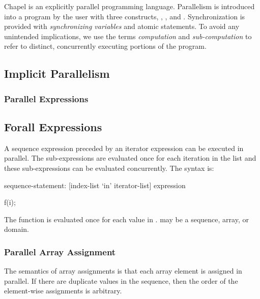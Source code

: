 \label{Parallelism_and_Synchronization}

Chapel is an explicitly parallel programming language. Parallelism is
introduced into a program by the user with three constructs,
, , and .  Synchronization is
provided with \emph{synchronizing variables} and atomic statements. To
avoid any unintended implications, we use the terms \emph{computation}
and \emph{sub-computation} to refer to distinct, concurrently
executing portions of the program.


\subsection{Implicit Parallelism}
\label{Implicit_Parallelism}


\subsubsection{Parallel Expressions}
\label{Parallel_Expressions}

\subsection{Forall Expressions} %
\label{Forall_Expressions}

A sequence expression preceded by an iterator expression can be
executed in parallel. The sub-expressions are evaluated once for each
iteration in the list and these sub-expressions can be evaluated
concurrently. The syntax is:
\begin{syntax}
sequence-statement:
   [index-list `in' iterator-list] expression
\end{syntax}

\begin{example}
\begin{chapel}
[i in S] f(i);
\end{chapel}
The function  is evaluated once for each value in . 
may be a sequence, array, or domain.
\end{example}

\subsubsection{Parallel Array Assignment}
\label{Parallel_Array_Assignment}

The semantics of array assignments is that each array element is
assigned in parallel. If there are duplicate values in the sequence,
then the order of the element-wise assignments is arbitrary.

